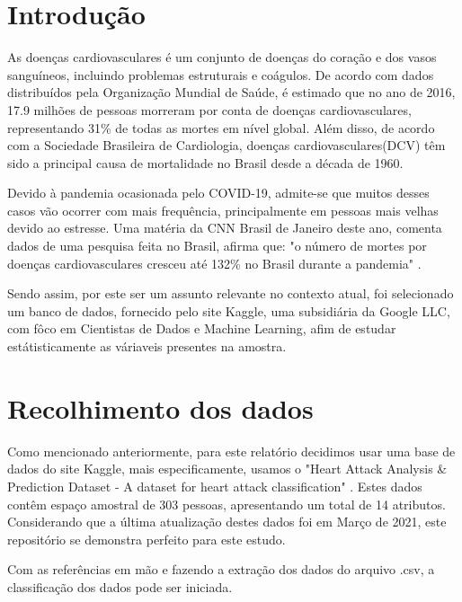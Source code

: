 \chapter*[Introdução]{Introdução}


    As doenças cardiovasculares é um conjunto de doenças do coração e dos vasos sanguíneos, incluindo 
    problemas estruturais e coágulos. De acordo com dados distribuídos pela Organização Mundial de Saúde\cite{oms},
    é estimado que no ano de 2016, 17.9 milhões de pessoas morreram por conta de doenças cardiovasculares, 
    representando 31\% de todas as mortes em nível global. Além disso, de acordo com a Sociedade Brasileira
    de Cardiologia, doenças cardiovasculares(DCV) têm sido a principal causa de mortalidade no Brasil desde a década de 1960.

    Devido à pandemia ocasionada pelo COVID-19, admite-se que muitos desses casos vão ocorrer
    com mais frequência, principalmente em pessoas mais velhas devido ao estresse. Uma matéria da 
    CNN Brasil de Janeiro deste ano, comenta dados de uma pesquisa feita no Brasil, afirma 
    que: "o número de mortes por doenças cardiovasculares cresceu até 132\% no Brasil durante a pandemia"
    \cite{abccardiol}.

    Sendo assim, por este ser um assunto relevante no contexto atual, foi selecionado um banco de 
    dados, fornecido pelo site Kaggle, uma subsidiária da Google LLC, com fôco em Cientistas 
    de Dados e Machine Learning, afim de estudar estátisticamente as váriaveis presentes na amostra.

    \newpage
    \chapter{Recolhimento dos dados}

    Como mencionado anteriormente, para este relatório decidimos usar uma base de dados do 
    site Kaggle, mais especificamente, usamos o "Heart Attack Analysis \& Prediction Dataset
     - A dataset for heart attack classification" \cite{bancodedados}. Estes dados contêm 
    espaço amostral de 303 pessoas, apresentando um total de 14 atributos. Considerando que a
    última atualização destes dados foi em Março de 2021, este repositório se demonstra 
    perfeito para este estudo.

    Com as referências em mão e fazendo a extração dos dados do arquivo .csv, a classificação
    dos dados pode ser iniciada.

    \newpage
